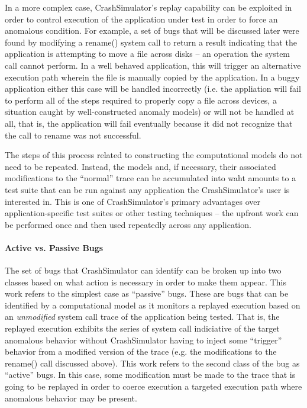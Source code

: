     In a more complex case, CrashSimulator's replay capability can be exploited in order to control execution of the
    application under test in order to force an anomalous condition.  For example, a set of bugs that will be discussed
    later were found by modifying a rename() system call to return a result indicating that the application is
    attempting to move a file across disks -- an operation the system call cannot perform.  In a well behaved
    application, this will trigger an alternative execution path wherein the file is manually copied by the application.
    In a buggy application either this case will be handled incorrectly (i.e. the appliation will fail to perform all of
    the steps required to properly copy a file across devices, a situation caught by well-constructed anomaly models) or
    will not be handled at all, that is, the application will fail eventually because it did not recognize that the call
    to rename was not successful.

    The steps of this process related to constructing the computational models do not need to be repeated.  Instead, the
    models and, if necessary, their associated modifications to the ``normal'' trace can be accumulated into waht
    amounts to a test suite that can be run against any application the CrashSimulator's user is interested in.  This is
    one of CrashSimulator's primary advantages over application-specific test suites or other testing techniques -- the
    upfront work can be performed once and then used repeatedly across any application.

    \paragraph{Active vs. Passive Bugs}

    The set of bugs that CrashSimulator can identify can be broken up into two classes based on what action is necessary
    in order to make them appear.  This work refers to the simplest case as ``passive'' bugs.  These are bugs that can
    be identified by a computational model as it monitors a replayed execution based on an \emph{unmodified} system call
    trace of the application being tested.  That is, the replayed execution exhibits the series of system call
    indiciative of the target anomalous behavior without CrashSimulator having to inject some ``trigger'' behavior from
    a modified version of the trace (e.g. the modifications to the rename() call discussed above).   This work refers to
    the second class of the bug as ``active'' bugs.  In this case, some modification must be made to the trace that is
    going to be replayed in order to coerce execution a targeted execution path where anomalous behavior may be present.
    
